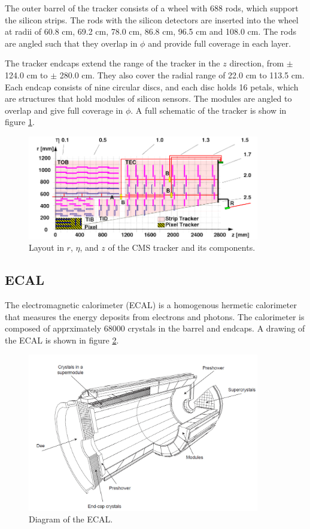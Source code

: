 \documentclass[oneside, letterpaper, oldfontcommands]{memoir}
\begin{document}
\qquad The outer barrel of the tracker consists of a wheel with 688 rods, which support the silicon strips. The rods with the silicon detectors are inserted into the wheel at radii of 60.8 cm, 69.2 cm, 78.0 cm, 86.8 cm, 96.5 cm and 108.0 cm. The rods are angled such that they overlap in $\phi$ and provide full coverage in each layer.

\qquad The tracker endcaps extend the range of the tracker in the $z$ direction, from $\pm$ 124.0 cm to $\pm$ 280.0 cm. They also cover the radial range of 22.0 cm to 113.5 cm. Each endcap consists of nine circular discs, and each disc holds 16 petals, which are structures that hold modules of silicon sensors. The modules are angled to overlap and give full coverage in $\phi$. A full schematic of the tracker is show in figure \ref{fig:cmstracker}.

\begin{figure}[here]
\includegraphics[width=0.9\textwidth]{cmstracker.png}
\caption{Layout in $r$, $\eta$, and $z$ of the CMS tracker and its components.  \cite{Chatrchyan:2014wfa}}
\label{fig:cmstracker}
\end{figure}

\subsection{ECAL}\label{ecal}

\qquad The electromagnetic calorimeter (ECAL) is a homogenous hermetic calorimeter that measures the energy deposits from electrons and photons. The calorimeter is composed of apprximately 68000 crystals in the barrel and endcaps. A drawing of the ECAL is shown in figure \ref{fig:cmsecal}.

\begin{figure}[here]
\includegraphics[width=0.9\textwidth]{cmsecal.png}
\caption{Diagram of the ECAL\cite{1748-0221-3-08-S08001}.}
\label{fig:cmsecal}
\end{figure}
\end{document}
